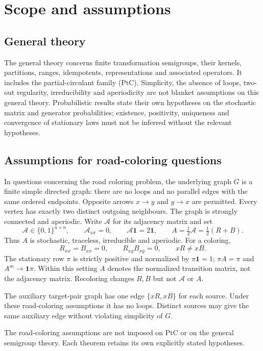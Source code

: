 \chapter*{Scope and assumptions}
\section*{General theory}
The general theory concerns finite transformation semigroups, their kernels,
partitions, ranges, idempotents, representations and associated operators.
It includes the partial-circulant family (PtC). Simplicity, the absence of
loops, two-out regularity, irreducibility and aperiodicity are not blanket
assumptions on this general theory. Probabilistic results state their
own hypotheses on the stochastic matrix and generator probabilities;
existence, positivity, uniqueness and convergence of stationary laws must
not be inferred without the relevant hypotheses.

\section*{Assumptions for road-coloring questions}
In questions concerning the road coloring problem, the underlying graph
$G$ is a finite simple directed graph: there are no loops and no parallel
edges with the same ordered endpoints. Opposite arrows $x\to y$ and
$y\to x$ are permitted. Every vertex has exactly two distinct outgoing
neighbours. The graph is strongly connected and aperiodic.
Write $\mathcal A$ for its adjacency matrix and set
\[
 \mathcal A\in\{0,1\}^{n\times n},\qquad
 \mathcal A_{xx}=0,\qquad\mathcal A\mathbf1=2\mathbf1,
 \qquad A=\tfrac12\mathcal A=\tfrac12(R+B).
\]
Thus $A$ is stochastic, traceless, irreducible and aperiodic. For a coloring,
\[
 R_{xx}=B_{xx}=0,\qquad R_{xy}B_{xy}=0,
 \qquad xR\ne xB.
\]
The stationary row $\pi$ is strictly positive and normalized by
$\pi\mathbf1=1$; $\pi A=\pi$ and $A^m\to\mathbf1\pi$.
Within this setting $A$ denotes the normalized transition matrix, not the
adjacency matrix. Recoloring changes $R,B$ but not $\mathcal A$ or $A$.

The auxiliary target-pair graph has one edge $\{xR,xB\}$ for each source.
Under these road-coloring assumptions it has no loops. Distinct sources
may give the same auxiliary edge without violating simplicity of $G$.

The road-coloring assumptions are not imposed on PtC or on the general
semigroup theory. Each theorem retains its own explicitly stated hypotheses.

